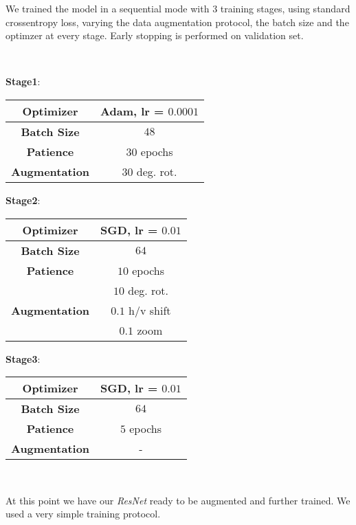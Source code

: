 \documentclass[fleqn,10pt]{SelfArx}
\begin{document}
We trained the model in a sequential mode with $3$ training stages, using standard crossentropy loss, varying the data augmentation protocol, the batch size and the optimzer at every stage. Early stopping is performed on validation set.

\

\textbf{Stage1}:
\begin{center}
\begin{tabular}{||c c||}  
 \hline
 \textbf{Optimizer} & Adam, lr = $0.0001$ \\ 
 \hline
 \textbf{Batch Size} & $48$ \\
 \hline
 \textbf{Patience} & $30$ epochs \\
 \hline
 \textbf{Augmentation} & $30$ deg. rot. \\
 \hline
\end{tabular}
\end{center}

\textbf{Stage2}:
\begin{center}
\begin{tabular}{||c c||}  
 \hline
 \textbf{Optimizer} & SGD, lr = $0.01$ \\ 
 \hline
 \textbf{Batch Size} & $64$ \\
 \hline
 \textbf{Patience} & $10$ epochs \\
 \hline
                                 & $10$ deg. rot. \\
  \textbf{Augmentation} & $0.1$ h/v shift \\
                                 & $0.1$ zoom \\
 \hline
\end{tabular}
\end{center}

\textbf{Stage3}:

\begin{center}
\begin{tabular}{||c c||}  
 \hline
 \textbf{Optimizer} & SGD, lr = $0.01$ \\ 
 \hline
 \textbf{Batch Size} & $64$ \\
 \hline
 \textbf{Patience} & $5$ epochs \\
 \hline
 \textbf{Augmentation} & - \\
 \hline
\end{tabular}
\end{center}

\

At this point we have our \textit{ResNet} ready to be augmented and further trained. We used a very simple training protocol.
\end{document}

